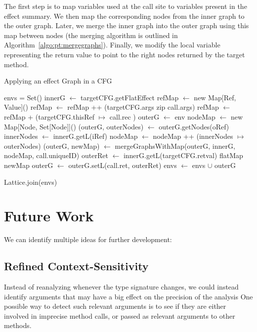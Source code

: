 \documentclass[a4paper]{article}
\begin{document}
The first step is to map variables used at the call site to variables present
in the effect summary. We then map the corresponding nodes from the inner graph
to the outer graph. Later, we merge the inner graph into the outer graph using this
map between nodes (the merging algorithm is outlined in
Algorithm~\ref{algo:pt:mergegraphs}). Finally, we modify the local variable
representing the return value to point to the right nodes returned by the
target method.


\begin{algorithm}
\caption{Applying an effect Graph in a CFG}\label{algo:pt:applyeffects}
\begin{algorithmic}[1]
    \State envs = Set()
        \State innerG $\gets$ targetCFG.getFlatEffect
        \State refMap $\gets$ new Map[Ref, Value]()
        \State refMap $\gets$ refMap ++ (targetCFG.args zip call.args)
        \State refMap $\gets$ refMap + (targetCFG.thisRef $\mapsto$ call.rec )
        \State
        \State outerG $\gets$ env
        \State nodeMap $\gets$ new Map[Node, Set[Node]]()
            \State (outerG, outerNodes) $\gets$ outerG.getNodes(oRef)
            \State innerNodes $\gets$ innerG.getL(iRef)
            \State nodeMap $\gets$ nodeMap ++ (innerNodes $\mapsto$ outerNodes)
        \EndFor
        \State
        \State (outerG, newMap) $\gets$ mergeGraphsWithMap(outerG, innerG, nodeMap, call.uniqueID)
        \State
        \State outerRet $\gets$ innerG.getL(targetCFG.retval) flatMap newMap
        \State outerG $\gets$ outerG.setL(call.ret, outerRet)
        \State
        \State envs $\gets$ envs $\cup$ outerG
    \EndFor

    \State \Return Lattice.join(envs)
\EndFunction
\end{algorithmic}
\end{algorithm}

\FloatBarrier

\section{Future Work}
We can identify multiple ideas for further development:

\subsection{Refined Context-Sensitivity}
Instead of reanalyzing whenever the type signature changes, we could instead
identify arguments that may have a big effect on the precision of the analysis
One possible way to detect such relevant arguments is to see if they are either
involved in imprecise method calls, or passed as relevant arguments to other
methods.
\end{document}

